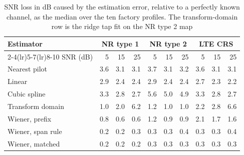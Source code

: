 \begin{table}[t]
\caption{SNR loss in dB caused by the estimation error, relative to a perfectly known channel, as the median over the ten factory profiles. The transform-domain row is the ridge tap fit on the NR type 2 map}
\label{tab:rate}
\centering
\footnotesize
\setlength{\tabcolsep}{5pt}
\begin{tabular}{l rrr rrr rrr}
\toprule
Estimator & \multicolumn{3}{c}{NR type 1} & \multicolumn{3}{c}{NR type 2} & \multicolumn{3}{c}{LTE CRS} \\
\cmidrule(lr){2-4}\cmidrule(lr){5-7}\cmidrule(lr){8-10}
SNR (dB) & 5 & 15 & 25 & 5 & 15 & 25 & 5 & 15 & 25 \\
\midrule
Nearest pilot & 3.6 & 3.1 & 3.1 & 3.7 & 3.1 & 3.2 & 3.6 & 3.1 & 3.1 \\
Linear & 2.9 & 2.4 & 2.4 & 2.9 & 2.4 & 2.4 & 2.7 & 2.3 & 2.2 \\
Cubic spline & 3.3 & 2.8 & 2.7 & 5.6 & 5.0 & 4.9 & 3.3 & 2.8 & 2.7 \\
Transform domain & 1.0 & 2.0 & 6.2 & 1.2 & 1.0 & 1.0 & 2.2 & 2.8 & 6.6 \\
Wiener, prefix & 0.8 & 0.6 & 0.6 & 1.2 & 0.9 & 0.9 & 2.1 & 1.7 & 1.6 \\
Wiener, span rule & 0.2 & 0.2 & 0.3 & 0.3 & 0.3 & 0.4 & 0.3 & 0.3 & 0.4 \\
Wiener, matched & 0.2 & 0.2 & 0.2 & 0.3 & 0.3 & 0.3 & 0.3 & 0.3 & 0.3 \\
\bottomrule
\end{tabular}
\end{table}
